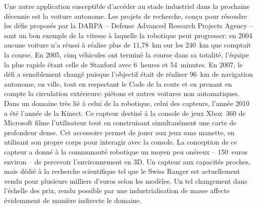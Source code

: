 Une autre application susceptible d'accéder au stade industriel dans
la prochaine décennie est la voiture autonome. Les projets de
recherche, conçu pour résoudre les défis proposés par la DARPA --
Defense Advanced Research Projects Agency -- sont un bon exemple de la
vitesse à laquelle la robotique peut progresser: en 2004 aucune
voiture n'a réussi à réalise plus de 11,78 km sur les 240 km que
comptait la course. En 2005, cinq véhicules ont terminé la course dans
sa totalité, l'équipe la plus rapide étant celle de Stanford avec
6 heures et 54 minutes. En 2007, le défi a sensiblement changé puisque
l'objectif était de réaliser 96 km de navigation autonome, en ville,
tout en respectant le Code de la route et en prenant en compte la
circulation extérieure: piétons et autres voitures non
automatiques. Dans un domaine très lié à celui de la robotique, celui
des capteurs, l'année 2010 a été l'année de la Kinect. Ce capteur
destiné à la console de jeux Xbox 360 de Microsoft filme l'utilisateur
tout en construisant simultanément une carte de profondeur dense. Cet
accessoire permet de jouer aux jeux sans manette, en utilisant son
propre corps pour interagir avec la console. La conception de ce
capteur a donné à la communauté robotique un moyen peu onéreux --
150 euros environ -- de percevoir l'environnement en 3D. Un capteur
aux capacités proches, mais dédié à la recherche scientifique tel que
le Swiss Ranger est actuellement vendu pour plusieurs milliers d'euros
selon les modèles. Un tel changement dans l'échelle des prix, rendu
possible par une industrialisation de masse affecte évidemment de
manière indirecte le domaine.


